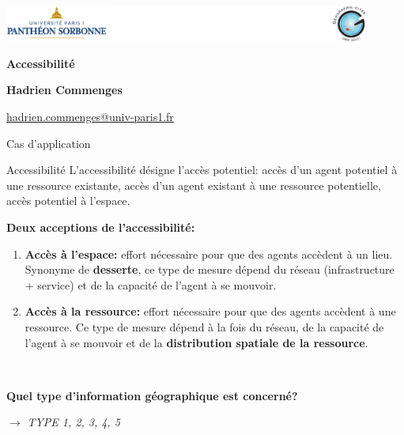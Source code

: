 \graphicspath{{IMAGE/}}


\begin{frame}

\includegraphics[width=12cm]{Logos.pdf}

\vfill

\begin{center}

\vspace*{1.5cm}

\LARGE
\textbf{Accessibilité}

\vspace*{2.5cm}

\large

\textbf{Hadrien Commenges}

{\small

\vspace*{0.1cm}

\url{hadrien.commenges@univ-paris1.fr}}

\end{center}

\end{frame}


\begin{frame}{Cas d'application}


\begin{block}{Accessibilité}
L'accessibilité désigne l'accès potentiel: accès d'un agent potentiel à une ressource existante, accès d'un agent existant à une ressource potentielle, accès potentiel à l'espace. 
\end{block}

\textbf{Deux acceptions de l'accessibilité:}

\begin{enumerate}
  \item \textbf{Accès à l'espace:} effort nécessaire pour que des agents accèdent à un lieu. Synonyme de \textbf{desserte}, ce type de mesure dépend du réseau (infrastructure + service) et de la capacité de l'agent à se mouvoir.
  \item \textbf{Accès à la ressource:} effort nécessaire pour que des agents accèdent à une ressource. Ce type de mesure dépend à la fois du réseau, de la capacité de l'agent à se mouvoir et de la \textbf{distribution spatiale de la ressource}.
\end{enumerate}

~

\textbf{Quel type d'information géographique est concerné?}

$\rightarrow$ \textit{TYPE 1, 2, 3, 4, 5}

\end{frame}



